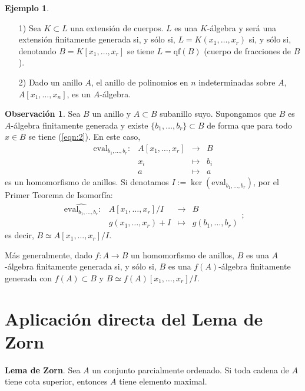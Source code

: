 \documentclass[a4paper,12pt]{article}
\theoremstyle{definition}
\newtheorem{example}[theorem]{Ejemplo}
\newtheorem{remark}[theorem]{Observación}
\begin{document}
\begin{example}\begin{itemize}
    \item[1)] Sea $K\subset L$ una extensión de cuerpos. $L$ es una $K$-álgebra y será una extensión finitamente generada si, y sólo si, $L=K(x_1,\dots,x_r)$ si, y sólo si, denotando $B=K[x_1,\dots,x_r]$ se tiene $L=\text{qf}(B)$ (cuerpo de fracciones de $B$).
    \item[2)] Dado un anillo $A$, el anillo de polinomios en $n$ indeterminadas sobre $A$, $A[x_1,\dots,x_n]$, es un $A$-álgebra.
\end{itemize}
\end{example}
\begin{remark} Sea $B$ un anillo y $A\subset B$ subanillo suyo. Supongamos que $B$ es $A$-álgebra finitamente generada y existe $\{b_1,\dots,b_r\}\subset B$ de forma que para todo $x\in B$ se tiene (\ref{eqn:2}). En este caso,$$\begin{array}{rrcl}
    \text{eval}_{b_1,\dots,b_r}:&A[x_1,\dots,x_r]&\longrightarrow&B\\
    &x_i&\longmapsto&b_i\\
    &a&\longmapsto&a
\end{array}$$es un homomorfismo de anillos.
Si denotamos $I:=\ker(\text{eval}_{b_1,\dots,b_r})$, por el Primer Teorema de Isomorfía:$$\begin{array}{rrcl}
    \widehat{\text{eval}_{b_1,\dots,b_r}}:&A[x_1,\dots,x_r]/I&\longrightarrow&B\\
    &g(x_1,\dots,x_r)+I&\longmapsto&g(b_1,\dots,b_r)
\end{array};$$es decir, $B\simeq A[x_1,\dots,x_r]/I$.

Más generalmente, dado $f: A\longrightarrow B$ un homomorfismo de anillos, $B$ es una $A$-álgebra finitamente generada si, y sólo si, $B$ es una $f(A)$-álgebra finitamente generada con $f(A)\subset B$ y $B\simeq f(A)[x_1,\dots,x_r]/I$.
\end{remark}
\section{Aplicación directa del Lema de Zorn}
\textbf{Lema de Zorn}. Sea $A$ un conjunto parcialmente ordenado. Si toda cadena de $A$ tiene cota superior, entonces $A$ tiene elemento maximal.
\end{document}
